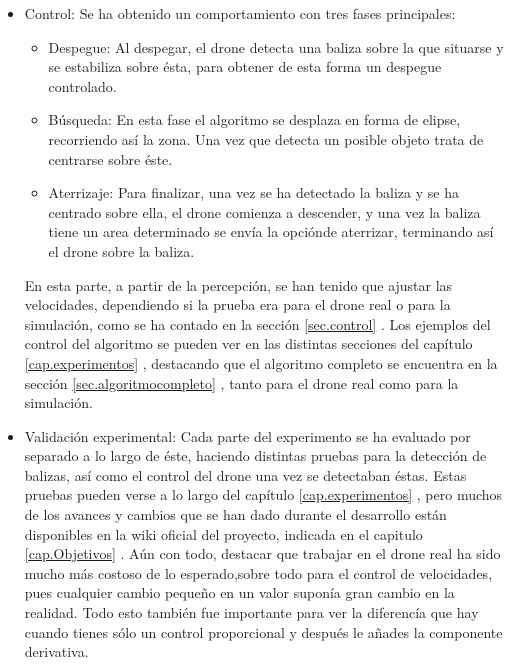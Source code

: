 \begin{itemize}
\item{Control:} Se ha obtenido un comportamiento con tres fases principales:
	\begin{itemize}
		\item{Despegue: } Al despegar, el drone detecta una baliza sobre la que situarse y se estabiliza sobre \'esta, para obtener de esta forma un despegue controlado.
		\item{B\'usqueda: } En esta fase el algoritmo se desplaza en forma de elipse, recorriendo as\'i la zona. Una vez que detecta un posible objeto trata de centrarse sobre \'este.
		\item{Aterrizaje: } Para finalizar, una vez se ha detectado la baliza y se ha centrado sobre ella, el drone comienza a descender, y una vez la baliza tiene un area determinado se env\'ia la opci\'onde aterrizar, terminando as\'i el drone sobre la baliza.
	\end{itemize}
	

\hspace{1cm} En esta parte, a partir de la percepci\'on, se han tenido que ajustar las velocidades, dependiendo si la prueba era para el drone real o para la simulaci\'on, como se ha contado en la secci\'on \ref{sec.control} . Los ejemplos del control del algoritmo se pueden ver en las distintas secciones del cap\'itulo \ref{cap.experimentos} , destacando que el algoritmo completo se encuentra en la secci\'on \ref{sec.algoritmocompleto} , tanto para el drone real como para la simulaci\'on. 

\item{Validaci\'on experimental:} Cada parte del experimento se ha evaluado por separado a lo largo de \'este, haciendo distintas pruebas para la detecci\'on de balizas, as\'i como el control del drone una vez se detectaban \'estas. Estas pruebas pueden verse a lo largo del cap\'itulo \ref{cap.experimentos} , pero muchos de los avances y cambios que se han dado durante el desarrollo est\'an disponibles en la wiki oficial del proyecto, indicada en el capitulo \ref{cap.Objetivos} . A\'un con todo, destacar que trabajar en el drone real ha sido mucho m\'as costoso de lo esperado,sobre todo para el control de velocidades, pues cualquier cambio pequeño en un valor supon\'ia gran cambio en la realidad. Todo esto tambi\'en fue importante para ver la diferenc\'ia que hay cuando tienes s\'olo un control proporcional y despu\'es le añades la componente derivativa. 
		
\end{itemize}


